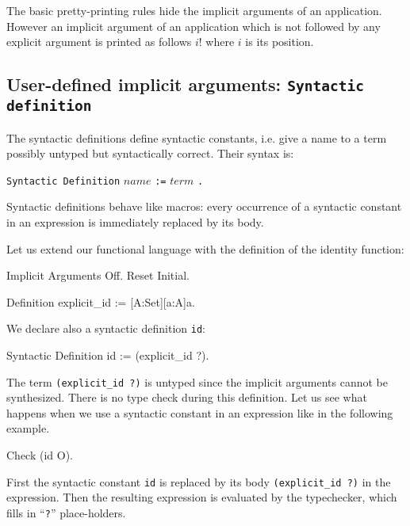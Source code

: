 \begin{coq_example}
The basic pretty-printing rules hide the implicit arguments of an
application. However an implicit argument {\term} of an application
which is not followed by any explicit argument is printed as follows
$i!${\term} where $i$ is its position.

\subsection{User-defined implicit arguments: {\tt Syntactic definition}}
\label{Syntactic-Definition}

The syntactic definitions define syntactic constants, i.e. give a name
to a term possibly untyped but syntactically correct. Their syntax
is:

\begin{center}
\verb+Syntactic Definition+ $name$ \verb+:=+ $term$ \verb+.+ \\
\end{center}

Syntactic definitions behave like macros: every occurrence of a
syntactic constant in an expression is immediately replaced by its
body.

Let us extend our functional language with the definition of the
identity function:

\begin{coq_eval}
Implicit Arguments Off.
Reset Initial.
\end{coq_eval}
\begin{coq_example}
Definition explicit_id := [A:Set][a:A]a.
\end{coq_example}

We declare also a syntactic definition {\tt id}:

\begin{coq_example}
Syntactic Definition id := (explicit_id ?).
\end{coq_example}

The term {\tt (explicit\_id ?)} is untyped since the implicit
arguments cannot be synthesized. There is no type check during this
definition.  Let us see what happens when we use a syntactic constant
in an expression like in the following example.

\begin{coq_example}
Check (id O).
\end{coq_example}

\noindent First the syntactic constant {\tt id} is replaced by its
body {\tt (explicit\_id ?)} in the expression. Then the resulting
expression is evaluated by the typechecker, which fills in
``\verb+?+'' place-holders.


\end{coq_example}
